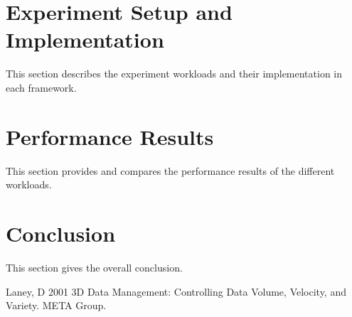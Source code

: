 \documentclass[]{article}
\begin{document}
\section{Experiment Setup and Implementation}
This section describes the experiment workloads and their implementation in each framework.
\section{Performance Results}

This section provides and compares the performance results of the different workloads.

\section{Conclusion}
This section gives the overall conclusion.


\begin{thebibliography}{[MT1]}
%
Laney, D 2001 3D Data Management: Controlling Data Volume, Velocity, and Variety. META Group.

%
\end{thebibliography}
\end{document}
